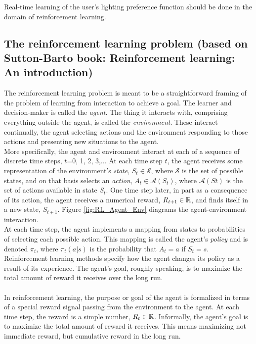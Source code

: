 \documentclass[a4paper]{article}
\begin{document}
Real-time learning of the user's lighting preference function should be done in the domain of reinforcement learning.

\subsection{The reinforcement learning problem \color{gray}(based on Sutton-Barto book: Reinforcement learning: An introduction)}

The reinforcement learning problem is meant to be a straightforward framing of the problem of learning from interaction to achieve a goal. The learner and
decision-maker is called the \textit{agent}. The thing it interacts with, comprising everything outside the agent, is called the \textit{environment}. These interact continually, the agent selecting actions and the environment responding to those actions and presenting new situations to the agent.
\\
\indent More specifically, the agent and environment interact at each of a sequence of discrete time steps, $t$=0, 1, 2, 3,... At each time step $t$, the agent receives
some representation of the environment's \textit{state}, $S_t \in \mathcal{S}$, where $\mathcal{S}$ is the set of possible states, and on that basis selects an \textit{action}, $A_t \in \mathcal{A}(S_t)$, where $\mathcal{A}(St)$ is the set of actions available in state $S_t$. One time step later, in part as a consequence of its action, the agent receives a numerical reward, $R_{t+1} \in \Bbb R$, and finds itself in a new state, $S_{t+1}$. Figure \ref{fig:RL_Agent_Env} diagrams the agent-environment interaction.
\\
\indent At each time step, the agent implements a mapping from states to probabilities of selecting each possible action. This mapping is called the agent's
\textit{policy} and is denoted $\pi_t$, where $\pi_t(a|s)$ is the probability that $A_t = a$ if $S_t = s$. Reinforcement learning methods specify how the agent changes its policy as a result of its experience. The agent's goal, roughly speaking, is to maximize the total amount of reward it receives over the long run.
\\\\
\indent In reinforcement learning, the purpose or goal of the agent is formalized in terms of a special reward signal passing from the environment to the agent.
At each time step, the reward is a simple number, $R_t \in  \Bbb R$. Informally, the agent's goal is to maximize the total amount of reward it receives. This means
maximizing not immediate reward, but cumulative reward in the long run.
\end{document}
